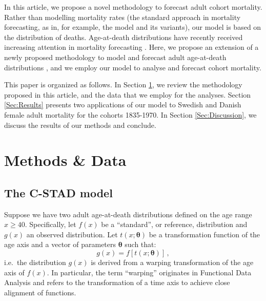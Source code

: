 \documentclass[11pt, a4paper]{article}
\begin{document}
In this article, we propose a novel methodology to forecast adult cohort mortality. Rather than modelling mortality rates (the standard approach in mortality forecasting, as in, for example, the \citeauthor{lee1992modeling} model and its variants), our model is based on the distribution of deaths. Age-at-death distributions have recently received increasing attention in mortality forecasting \citep{oeppen2008coherent,bergeron2017coherent,basellini2019modelling,pascariu2019maximum}. Here, we propose an extension of a newly proposed methodology to model and forecast adult age-at-death distributions \citep{basellini2019modelling}, and we employ our model to analyse and forecast cohort mortality. \par 
 
This paper is organized as follows. In Section \ref{Sec:Methods}, we review the methodology proposed in this article, and the data that we employ for the analyses. Section \ref{Sec:Results} presents two applications of our model to Swedish and Danish female adult mortality for the cohorts 1835-1970. In Section \ref{Sec:Discussion}, we discuss the results of our methods and conclude. 

\section{Methods \& Data}
\label{Sec:Methods}
\subsection{The C-STAD model}
\label{Subsec:C-STADmodel}
Suppose we have two adult age-at-death distributions defined on the age range $x \geq 40$. Specifically, let $f(x)$ be a ``standard'', or reference, distribution and $g(x)$ an observed distribution. Let $t(x;\bm{\theta})$ be a transformation function of the age axis and a vector of parameters $\bm{\theta}$ such that:
%
\begin{equation}\label{Eq:gxftx}
g(x) = f\left[t(x;\bm{\theta})\right]\,, 
\end{equation}  
%
i.e.~the distribution $g(x)$ is derived from a warping transformation of the age axis of $f(x)$. In particular, the term ``warping'' originates in Functional Data Analysis \citep{ramsay2005FDA} and refers to the transformation of a time axis to achieve close alignment of functions. \par
\end{document}
